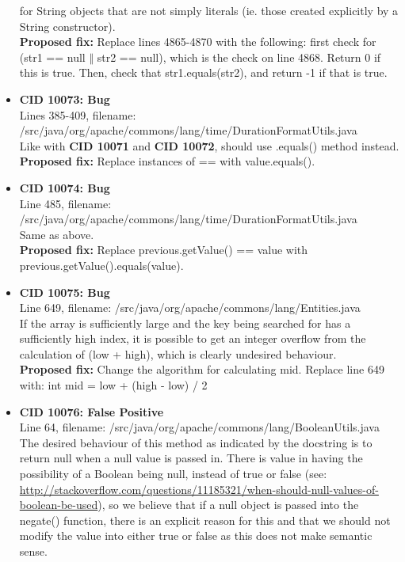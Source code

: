 \documentclass{article}
\begin{document}
\begin{itemize}
    for String objects that are not simply literals (ie. those created explicitly by a String constructor). \\
    \textbf{Proposed fix:} Replace lines 4865-4870 with the following: first check for (str1 == null $\Vert$ str2 == null), which is the check on line 4868.
    Return 0 if this is true. Then, check that str1.equals(str2), and return -1 if that is true.
\item \textbf{CID 10073: Bug} \\
    Lines 385-409, filename: /src/java/org/apache/commons/lang/time/DurationFormatUtils.java \\
    Like with \textbf{CID 10071} and \textbf{CID 10072}, should use .equals() method instead. \\
    \textbf{Proposed fix:} Replace instances of == with value.equals().
\item \textbf{CID 10074: Bug} \\
    Line 485, filename: /src/java/org/apache/commons/lang/time/DurationFormatUtils.java \\
    Same as above. \\
    \textbf{Proposed fix:} Replace previous.getValue() == value with previous.getValue().equals(value).
\item \textbf{CID 10075: Bug} \\
    Line 649, filename: /src/java/org/apache/commons/lang/Entities.java \\
    If the array is sufficiently large and the key being searched for has a sufficiently high index, it is possible to get an integer
    overflow from the calculation of (low + high), which is clearly undesired behaviour. \\
    \textbf{Proposed fix:} Change the algorithm for calculating mid. Replace line 649 with: int mid = low + (high - low) / 2
\item \textbf{CID 10076: False Positive} \\
    Line 64, filename: /src/java/org/apache/commons/lang/BooleanUtils.java \\
    The desired behaviour of this method as indicated by the docstring is to return null when a null value is passed in.
    There is value in having the possibility of a Boolean being null, instead of true or false 
    (see: \url{http://stackoverflow.com/questions/11185321/when-should-null-values-of-boolean-be-used}), so we believe that
    if a null object is passed into the negate() function, there is an explicit reason for this and that we should not
    modify the value into either true or false as this does not make semantic sense.

\end{itemize}
\end{document}
